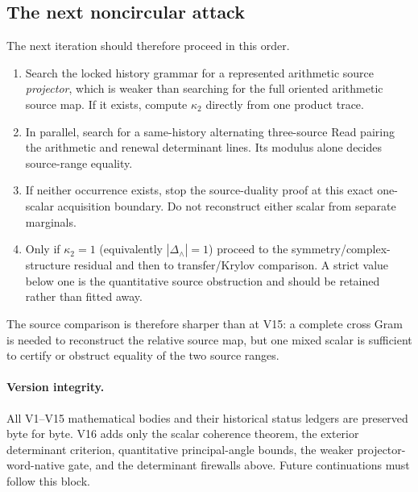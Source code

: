 \documentclass[11pt]{article}
\theoremstyle{definition}
\theoremstyle{remark}
\begin{document}
\subsection{The next noncircular attack}
The next iteration should therefore proceed in this order.
\begin{enumerate}[label=\textup{(N\arabic*)},leftmargin=3em]
\item Search the locked history grammar for a represented arithmetic source
      \emph{projector}, which is weaker than searching for the full oriented
      arithmetic source map.  If it exists, compute $\kappa_2$ directly from
      one product trace.
\item In parallel, search for a same-history alternating three-source Read
      pairing the arithmetic and renewal determinant lines.  Its modulus alone
      decides source-range equality.
\item If neither occurrence exists, stop the source-duality proof at this
      exact one-scalar acquisition boundary.  Do not reconstruct either scalar
      from separate marginals.
\item Only if $\kappa_2=1$ (equivalently $|\Delta_\wedge|=1$) proceed to the
      symmetry/complex-structure residual and then to transfer/Krylov
      comparison.  A strict value below one is the quantitative source
      obstruction and should be retained rather than fitted away.
\end{enumerate}

The source comparison is therefore sharper than at V15: a complete cross Gram
is needed to reconstruct the relative source map, but one mixed scalar is
sufficient to certify or obstruct equality of the two source ranges.

\paragraph{Version integrity.}
All V1--V15 mathematical bodies and their historical status ledgers are
preserved byte for byte.  V16 adds only the scalar coherence theorem, the
exterior determinant criterion, quantitative principal-angle bounds, the
weaker projector-word-native gate, and the determinant firewalls above.
Future continuations must follow this block.



\end{document}

